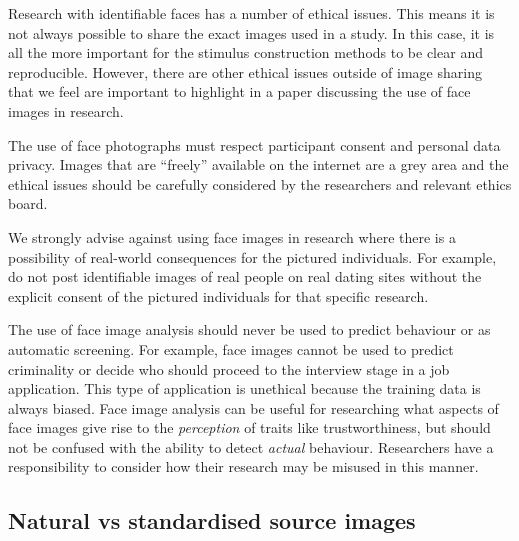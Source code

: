\documentclass[
  doc,floatsintext]{apa6}
\begin{document}
Research with identifiable faces has a number of ethical issues. This means it is not always possible to share the exact images used in a study. In this case, it is all the more important for the stimulus construction methods to be clear and reproducible. However, there are other ethical issues outside of image sharing that we feel are important to highlight in a paper discussing the use of face images in research.

The use of face photographs must respect participant consent and personal data privacy. Images that are ``freely'' available on the internet are a grey area and the ethical issues should be carefully considered by the researchers and relevant ethics board.

We strongly advise against using face images in research where there is a possibility of real-world consequences for the pictured individuals. For example, do not post identifiable images of real people on real dating sites without the explicit consent of the pictured individuals for that specific research.

The use of face image analysis should never be used to predict behaviour or as automatic screening. For example, face images cannot be used to predict criminality or decide who should proceed to the interview stage in a job application. This type of application is unethical because the training data is always biased. Face image analysis can be useful for researching what aspects of face images give rise to the \emph{perception} of traits like trustworthiness, but should not be confused with the ability to detect \emph{actual} behaviour. Researchers have a responsibility to consider how their research may be misused in this manner.

\hypertarget{natural-vs-standardised-source-images}{%
\subsection{Natural vs standardised source images}\label{natural-vs-standardised-source-images}}
\end{document}
